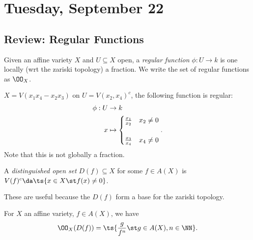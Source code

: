 \hypertarget{tuesday-september-22}{%
\section{Tuesday, September 22}\label{tuesday-september-22}}

\hypertarget{review-regular-functions}{%
\subsection{Review: Regular Functions}\label{review-regular-functions}}

Given an affine variety \(X\) and \(U\subseteq X\) open, a \emph{regular
function} \(\phi: U\to k\) is one locally (wrt the zariski topology) a
fraction. We write the set of regular functions as \(\OO_X\).

\begin{example}

\(X = V(x_1 x_4 - x_2 x_3)\) on \(U = V(x_2, x_4)^c\), the following
function is regular:
\begin{align*}  
\phi: U &\to k \\
x &\mapsto 
\begin{cases}
{x_1\over x_2} & x_2 \neq 0 \\ \\
{x_3 \over x_4} & x_4 \neq 0
\end{cases}
.\end{align*} Note that this is not globally a fraction.

\end{example}

\begin{definition}

A \emph{distinguished open set} \(D(f) \subseteq X\) for some
\(f\in A(X)\) is \(V(f)^c \da \ts{x\in X \st f(x) \neq 0}\).

\end{definition}

These are useful because the \(D(f)\) form a base for the zariski
topology.

\begin{proposition}[?]

For \(X\) an affine variety, \(f\in A(X)\), we have
\begin{align*} 
\OO_X(D(f)) = \ts{ {g\over f^n} \st g\in A(X), n\in \NN}
.\end{align*}

\end{proposition}

